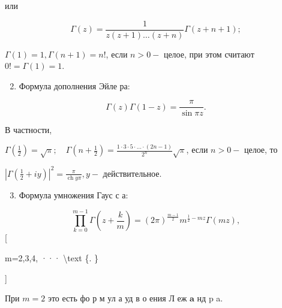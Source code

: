 \documentclass[10pt]{article}
\begin{document}
или



\[

\Gamma(z)=\frac{1}{z(z+1) \ldots(z+n)} \Gamma(z+n+1) ;

\]



$\Gamma(1)=1, \Gamma(n+1)=n !$, если $n>0-$ целое, при этом считают $0 !=\Gamma(1)=1$.



\begin{enumerate}

  \setcounter{enumi}{1}

  \item Формула дополнения Эйле ра:

\end{enumerate}



\[

\Gamma(z) \Gamma(1-z)=\frac{\pi}{\sin \pi z} .

\]



В частности,



$\Gamma\left(\frac{1}{2}\right)=\sqrt{\pi} ; \quad \Gamma\left(n+\frac{1}{2}\right)=\frac{1 \cdot 3 \cdot 5 \cdot \ldots \cdot(2 n-1)}{2^{n}} \sqrt{\pi}$, если $n>0-$ целое, то



$\left|\Gamma\left(\frac{1}{2}+i y\right)\right|^{2}=\frac{\pi}{\operatorname{ch} y \pi}, y-$ действительное.



\begin{enumerate}

  \setcounter{enumi}{2}

  \item Формула умножения Гаус с а:

\end{enumerate}



\[

\prod_{k=0}^{m-1} \Gamma\left(z+\frac{k}{m}\right)=(2 \pi)^{\frac{m-1}{2}} m^{\frac{1}{2}-m z} \Gamma(m z),

\][



m=2,3,4, ··· \textbackslash text \{. \}

]



При $m=2$ это есть фо р м ул а уд в о ения Л еж $\mathbf{a}$ нд $\mathrm{p}$ a.
\end{document}
